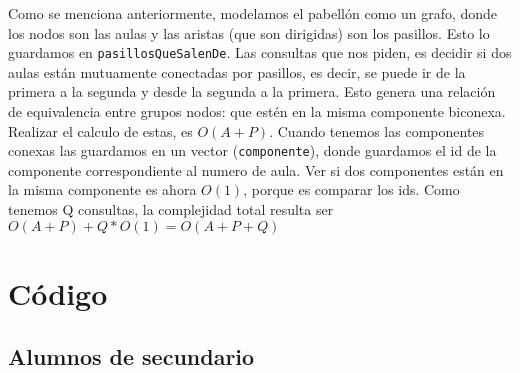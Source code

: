 \documentclass[a4paper]{article}
\begin{document}
Como se menciona anteriormente, modelamos el pabellón como un grafo, donde los nodos son las aulas y las aristas (que son dirigidas) son los pasillos. Esto lo guardamos en {\tt{}pasillosQueSalenDe}.
Las consultas que nos piden, es decidir si dos aulas están mutuamente conectadas por pasillos, es decir, se puede ir de la primera a la segunda y desde la segunda a la primera. Esto genera una relaci\'on de equivalencia entre grupos nodos: que estén en la misma componente biconexa. Realizar el calculo de estas, es $O(A+P)$. Cuando tenemos las componentes conexas las guardamos en un vector ({\tt{}componente}), donde guardamos el id de la componente correspondiente al numero de aula.
Ver si dos componentes están en la misma componente es ahora $O(1)$, porque es comparar los ids.
Como tenemos Q consultas, la complejidad total resulta ser $O(A+P)+Q*O(1) = O(A+P+Q)$

\newpage

\section{C\'odigo}

\subsection{Alumnos de secundario}
\end{document}
